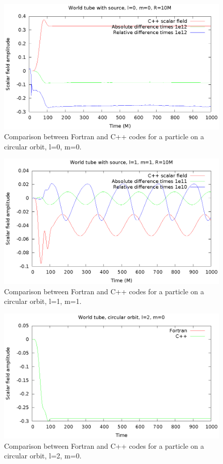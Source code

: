 \begin{figure}
  \includegraphics{wtcircl0m0}
  \caption{Comparison between Fortran and C++ codes for a particle on a circular orbit, l=0, m=0.}
  \label{circ1}
\end{figure}
\begin{figure}
  \includegraphics{wtcircl1m1}
  \caption{Comparison between Fortran and C++ codes for a particle on a circular orbit, l=1, m=1.}
  \label{circ2}
\end{figure}
\begin{figure}
  \includegraphics{wtcircl2m0}
  \caption{Comparison between Fortran and C++ codes for a particle on a circular orbit, l=2, m=0.}
  \label{circ3}
\end{figure}
